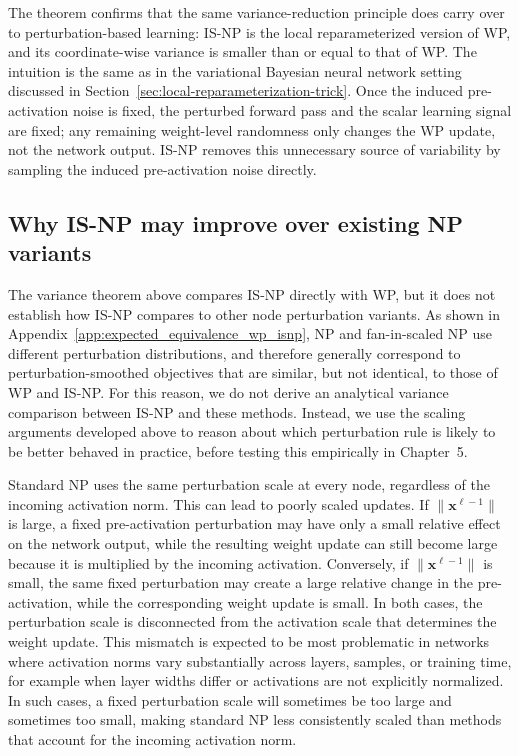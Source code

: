 The theorem confirms that the same variance-reduction principle does carry over to perturbation-based learning: IS-NP is the local reparameterized version of WP, and its coordinate-wise variance is smaller than or equal to that of WP. The intuition is the same as in the variational Bayesian neural network setting discussed in Section~\ref{sec:local-reparameterization-trick}. Once the induced pre-activation noise is fixed, the perturbed forward pass and the scalar learning signal are fixed; any remaining weight-level randomness only changes the WP update, not the network output. IS-NP removes this unnecessary source of variability by sampling the induced pre-activation noise directly.

\subsection{Why IS-NP may improve over existing NP variants}
The variance theorem above compares IS-NP directly with WP, but it does not establish how IS-NP compares to other node perturbation variants. As shown in Appendix~\ref{app:expected_equivalence_wp_isnp}, NP and fan-in-scaled NP use different perturbation distributions, and therefore generally correspond to perturbation-smoothed objectives that are similar, but not identical, to those of WP and IS-NP. For this reason, we do not derive an analytical variance comparison between IS-NP and these methods. Instead, we use the scaling arguments developed above to reason about which perturbation rule is likely to be better behaved in practice, before testing this empirically in Chapter~5.

Standard NP uses the same perturbation scale at every node, regardless of the incoming activation norm. This can lead to poorly scaled updates. If $\|\mathbf{x}^{\ell-1}\|$ is large, a fixed pre-activation perturbation may have only a small relative effect on the network output, while the resulting weight update can still become large because it is multiplied by the incoming activation. Conversely, if $\|\mathbf{x}^{\ell-1}\|$ is small, the same fixed perturbation may create a large relative change in the pre-activation, while the corresponding weight update is small. In both cases, the perturbation scale is disconnected from the activation scale that determines the weight update. This mismatch is expected to be most problematic in networks where activation norms vary substantially across layers, samples, or training time, for example when layer widths differ or activations are not explicitly normalized. In such cases, a fixed perturbation scale will sometimes be too large and sometimes too small, making standard NP less consistently scaled than methods that account for the incoming activation norm.

